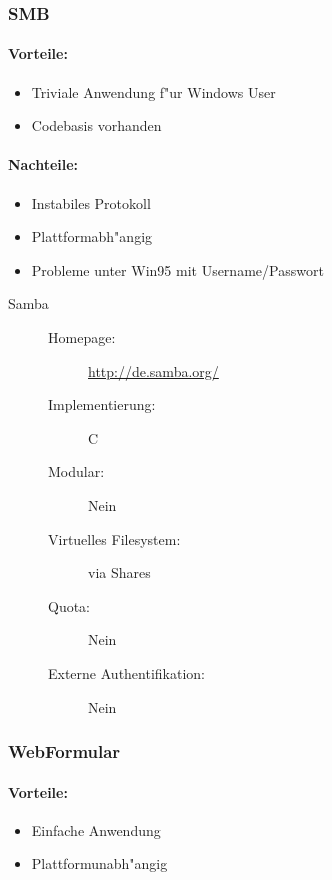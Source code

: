 \documentclass[12pt,a4paper]{article}
\begin{document}
\subsubsection{SMB}

\paragraph{Vorteile: }
\begin{itemize}
\item{Triviale Anwendung f"ur Windows User}
\item{Codebasis vorhanden}
\end{itemize}
\paragraph{Nachteile: }
\begin{itemize}
\item{Instabiles Protokoll}
\item{Plattformabh"angig}
\item{Probleme unter Win95 mit Username/Passwort}
\end{itemize}

\begin{description}
\item[Samba]
\begin{description}
\item[Homepage:]{\url{http://de.samba.org/}}
\item[Implementierung:]{C}
\item[Modular:]{Nein}
\item[Virtuelles Filesystem:]{via Shares}
\item[Quota:]{Nein}
\item[Externe Authentifikation:]{Nein}
\end{description}
\end{description}

\subsubsection{WebFormular}

\paragraph{Vorteile: }
\begin{itemize}
\item{Einfache Anwendung}
\item{Plattformunabh"angig}
\end{itemize}
\end{document}

